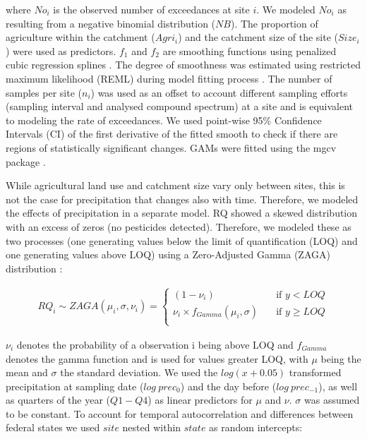 \documentclass[journal=esthag,manuscript=article]{achemso}
\begin{document}
where $No_i$ is the observed number of exceedances at site $i$. 
We modeled $No_i$ as resulting from a negative binomial distribution ($NB$).
The proportion of agriculture within the catchment ($Agri_i$) and the catchment size of the site ($Size_i$) were used as predictors. 
$f_1$ and $f_2$ are smoothing functions using penalized cubic regression splines \citep{wood_generalized_2006}.
The degree of smoothness was estimated using restricted maximum likelihood (REML) during model fitting process \citep{wood_fast_2011}.
The number of samples per site ($n_i$) was used as an offset to account different sampling efforts (sampling interval and analysed compound spectrum) at a site and is equivalent to modeling the rate of exceedances. 
We used point-wise 95\% Confidence Intervals (CI) of the first derivative of the fitted smooth to check if there are regions of statistically significant changes.
GAMs were fitted using the mgcv package \citep{wood_fast_2011}.

While agricultural land use and catchment size vary only between sites, this is not the case for precipitation that changes also with time.
Therefore, we modeled the effects of precipitation in a separate model.
RQ showed a skewed distribution with an excess of zeros (no pesticides detected). 
Therefore, we modeled these as two processes (one generating values below the limit of quantification (LOQ) and one generating values above LOQ) using a Zero-Adjusted Gamma (ZAGA) distribution \cite{rigby_generalized_2005,stasinopoulos_gamlss.dist:_2016}:

\begin{align}
RQ_i \sim ZAGA(\mu_i, \sigma, \nu_i) = 
  \begin{cases}
    (1 - \nu_i)   & \quad  \text{if } y < LOQ \\
    \nu_i \times f_{Gamma} (\mu_i, \sigma) & \quad \text{if } y \ge LOQ \\
  \end{cases}
  \label{eqn:eqn3}
\end{align}

$\nu_i$ denotes the probability of a observation i being above LOQ and $f_{Gamma}$ denotes the gamma function and is used for values greater LOQ, with $\mu$ being the mean and $\sigma$ the standard deviation.
We used the $log(x+0.05)$ transformed precipitation at sampling date ($log~prec_0$) and the day before ($log~prec_{-1}$), as well as quarters of the year ($Q1-Q4$) as linear predictors for $\mu$ and $\nu$. 
$\sigma$ was assumed to be constant. 
To account for temporal autocorrelation and differences between federal states we used $site$ nested within $state$ as random intercepts:
\end{document}
